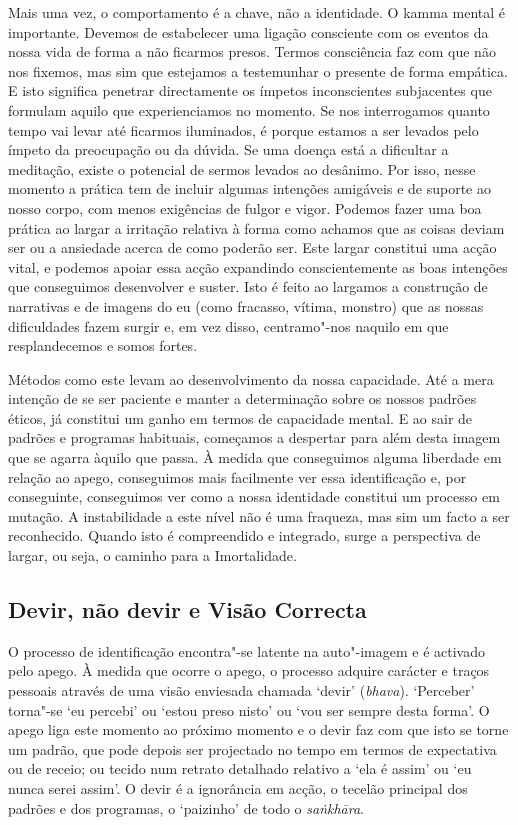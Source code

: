 Mais uma vez, o comportamento é a chave, não a identidade. O kamma mental é
importante. Devemos de estabelecer uma ligação consciente com os eventos da
nossa vida de forma a não ficarmos presos. Termos consciência faz com que não
nos fixemos, mas sim que estejamos a testemunhar o presente de forma empática. E
isto significa penetrar directamente os ímpetos inconscientes subjacentes que
formulam aquilo que experienciamos no momento. Se nos interrogamos quanto tempo
vai levar até ficarmos iluminados, é porque estamos a ser levados pelo ímpeto da
preocupação ou da dúvida. Se uma doença está a dificultar a meditação, existe o
potencial de sermos levados ao desânimo. Por isso, nesse momento a prática tem
de incluir algumas intenções amigáveis e de suporte ao nosso corpo, com menos
exigências de fulgor e vigor. Podemos fazer uma boa prática ao largar a
irritação relativa à forma como achamos que as coisas deviam ser ou a ansiedade
acerca de como poderão ser. Este largar constitui uma acção vital, e podemos
apoiar essa acção expandindo conscientemente as boas intenções que conseguimos
desenvolver e suster. Isto é feito ao largamos a construção de narrativas e de
imagens do eu (como fracasso, vítima, monstro) que as nossas dificuldades fazem
surgir e, em vez disso, centramo"-nos naquilo em que resplandecemos e somos
fortes.

Métodos como este levam ao desenvolvimento da nossa capacidade. Até a mera
intenção de se ser paciente e manter a determinação sobre os nossos padrões
éticos, já constitui um ganho em termos de capacidade mental. E ao sair de
padrões e programas habituais, começamos a despertar para além desta imagem que
se agarra àquilo que passa. À medida que conseguimos alguma liberdade em relação
ao apego, conseguimos mais facilmente ver essa identificação e, por conseguinte,
conseguimos ver como a nossa identidade constitui um processo em mutação. A
instabilidade a este nível não é uma fraqueza, mas sim um facto a ser
reconhecido. Quando isto é compreendido e integrado, surge a perspectiva de
largar, ou seja, o caminho para a Imortalidade.

\subsection{Devir, não devir e Visão Correcta}

O processo de identificação encontra"-se latente na auto"-imagem e é activado
pelo apego. À medida que ocorre o apego, o processo adquire carácter e traços
pessoais através de uma visão enviesada chamada `devir' (\emph{bhava}).
`Perceber' torna"-se `eu percebi' ou `estou preso nisto' ou `vou ser sempre
desta forma'. O apego liga este momento ao próximo momento e o devir faz com que
isto se torne um padrão, que pode depois ser projectado no tempo em termos de
expectativa ou de receio; ou tecido num retrato detalhado relativo a `ela é
assim' ou `eu nunca serei assim'. O devir é a ignorância em acção, o tecelão
principal dos padrões e dos programas, o `paizinho' de todo o \emph{saṅkhāra}.

